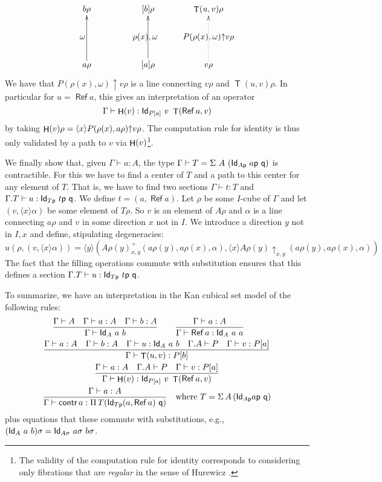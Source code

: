 \documentclass[10pt,a4paper]{article}
\DeclareMathOperator{\Ref}{\mathsf{Ref}}
\DeclareMathOperator{\Transp}{\mathsf{T}}
\DeclareMathOperator{\HH}{{\sf H}}
\newcommand{\Id}{{\sf Id}}
\newcommand{\pp}{{\sf p}}
\newcommand{\qq}{{\sf q}}
\newcommand{\rup}[1]{#1{\uparrow}}
\newcommand{\rupxy}[1]{#1{\uparrow_{x,y}}}
\newcommand{\bind}[2]{{\langle}#1{\rangle}#2}
\begin{document}
\[
\xymatrix@R=.6cm@C=.6cm{
b\rho                 &&[b]\rho                    &   \Transp(u,v)\rho                                 \\
\omega ~~~     &&\rho(x),\omega~~  &\rup{P(\rho(x),\omega)} v\rho \\
a\rho\ar[uu]      &&[a]\rho\ar[uu]       &   v\rho\ar@{.>}[uu]                        \\
}
\]
We have that $\rup{P(\rho(x),\omega)} v\rho$ is a line connecting
$v\rho$ and $\Transp(u,v)\rho$.  In particular for $u=\Ref a$, this gives
an interpretation of an operator
$$
\Gamma\vdash \HH(v):\Id_{P[a]}~v~\Transp(\Ref a,v)
$$
by taking $\HH(v)\rho = \bind{x}{\rup{P(\rho (x),a\rho)} v\rho}$.  The
computation rule for identity is thus only validated by a path to $v$
via $\HH(v)$\footnote{The validity of the computation rule for
  identity corresponds to considering only fibrations that are {\em
    regular} in the sense of Hurewicz \cite{hurewicz}.}.


We finally show that, given $\Gamma\vdash a:A$, the type $\Gamma
\vdash T = \Sigma~A~(\Id_{A\pp}~a\pp~\qq)$ is contractible. For this
we have to find a center of $T$ and a path to this center for any
element of $T$.  That is, we have to find two sections $\Gamma\vdash
t:T$ and $\Gamma.T\vdash u:\Id_{T\pp}~t\pp~\qq$.  We define $t =
(a,\Ref a)$. Let $\rho$ be some $I$-cube of $\Gamma$ and let
$(v,\bind{x}{\alpha})$ be some element of $T\rho$. So $v$ is an
element of $A\rho$ and $\alpha$ is a line connecting $a\rho$ and $v$
in some direction $x$ not in $I$. We introduce a direction $y$ not in
$I,x$ and define, stipulating degeneracies:
$$
u(\rho,(v,\bind{x}{\alpha})) = \bind{y}{(A\rho(y)^+ _{x,y}
  (a\rho(y),a\rho(x),\alpha),\bind{x}{\rupxy{A\rho(y)}
    (a\rho(y),a\rho(x),\alpha)})}
$$
The fact that the filling operations commute with substitution ensures
that this defines a section $\Gamma.T\vdash u:\Id_{T\pp}~t\pp~\qq$.

To summarize, we have an interpretation in the Kan cubical set model
of the following rules:
\begin{gather*}
  \frac {\Gamma \vdash A \quad \Gamma \vdash a : A \quad \Gamma \vdash
    b : A} {\Gamma \vdash \Id_A~a~b} \qquad
  \frac {\Gamma \vdash a : A} {\Gamma\vdash \Ref a:\Id_A~a~a} \qquad
  \\
  \frac {\Gamma\vdash a:A \quad \Gamma\vdash b:A \quad \Gamma\vdash
    u:\Id_A~a~b \quad \Gamma.A \vdash P \quad \Gamma\vdash v:P[a]}
  {\Gamma\vdash \Transp(u,v):P[b]}
  \\
  \frac {\Gamma \vdash a : A \quad \Gamma.A \vdash P \quad \Gamma
    \vdash v : P [a]} {\Gamma \vdash \HH (v):\Id_{P[a]}~v~\Transp(\Ref
    a,v)}
  \\
  \frac {\Gamma \vdash a : A} {\Gamma \vdash \mathsf{contr}\, a :
    \Pi\, T (\Id_{T \pp} (a, \Ref a)~\qq) } \quad \text {where } T =
  \Sigma\,A\,(\Id_{A \pp} a \pp~ \qq)
\end{gather*}
plus equations that these commute with substitutions, e.g.,
$(\Id_A~a~b) \sigma = \Id_{A \sigma}~a\sigma~ b\sigma$.
\end{document}
